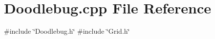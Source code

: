 \section{Doodlebug.\+cpp File Reference}
\label{Doodlebug_8cpp}
{\ttfamily \#include \char`\"{}Doodlebug.\+h\char`\"{}}\newline
{\ttfamily \#include \char`\"{}Grid.\+h\char`\"{}}\newline
